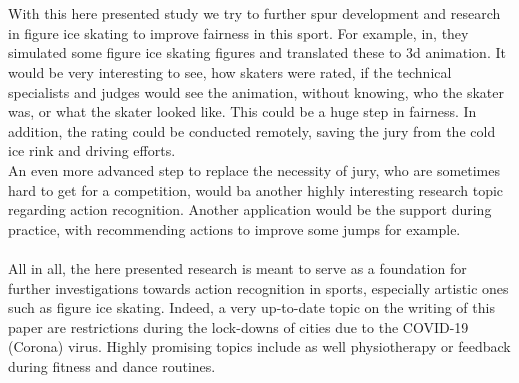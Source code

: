 \\\mbox{}\\
With this here presented study we try to further spur development and research in figure ice skating to improve
fairness in this sport.
For example, in\cite{figureskatingsimulation}, they simulated some figure ice skating figures and translated these to 3d
animation. It would be very interesting to see, how skaters were rated, if the technical specialists and judges would see
the animation, without knowing, who the skater was, or what the skater looked like.
This could be a huge step in fairness.
In addition, the rating could be conducted remotely, saving the jury from the cold
ice rink and driving efforts.\\
An even more advanced step to replace the necessity of jury, who are sometimes hard to get for a competition, would ba another
highly interesting research topic regarding action recognition.
Another application would be the support during practice, with recommending actions to improve some jumps for example.
\\\mbox{}\\
All in all, the here presented research is meant to serve as a foundation for further investigations towards action recognition
in sports, especially artistic ones such as figure ice skating.
Indeed, a very up-to-date topic on the writing of this paper are restrictions during the lock-downs of cities due to the
COVID-19 (Corona) virus.
Highly promising topics include as well physiotherapy or feedback during fitness and dance routines.
